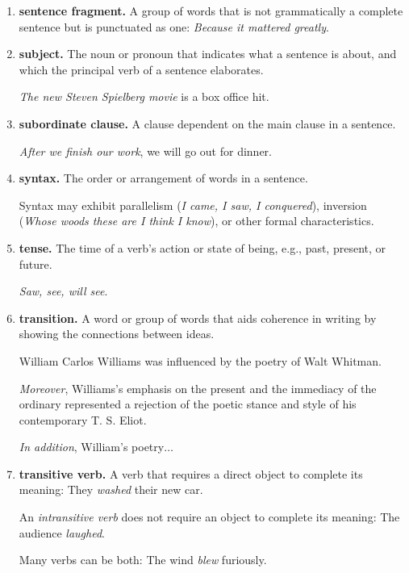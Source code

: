 \documentclass{book}
\numberwithin{equation}{section}
\begin{document}
\begin{enumerate}
    If commas were added before \textit{who} and after \textit{exceptionally}, the clause would be nonrestrictive and would suggest that \textit{all} professional athletes should receive stratospheric salaries.
    \item \textbf{sentence fragment.} A group of words that is not grammatically a complete sentence but is punctuated as one: \textit{Because it mattered greatly}.
    \item \textbf{subject.} The noun or pronoun that indicates what a sentence is about, and which the principal verb of a sentence elaborates.
    
    \textit{The new Steven Spielberg movie} is a box office hit.
    \item \textbf{subordinate clause.} A clause dependent on the main clause in a sentence.
    
    \textit{After we finish our work}, we will go out for dinner.
    \item \textbf{syntax.} The order or arrangement of words in a sentence.
    
    Syntax may exhibit parallelism (\textit{I came, I saw, I conquered}), inversion (\textit{Whose woods these are I think I know}), or other formal characteristics.
    \item \textbf{tense.} The time of a verb's action or state of being, e.g., past, present, or future.
    
    \textit{Saw, see, will see}.
    \item \textbf{transition.} A word or group of words that aids coherence in writing by showing the connections between ideas.
    
    William Carlos Williams was influenced by the poetry of Walt Whitman.
    
    \textit{Moreover}, Williams's emphasis on the present and the immediacy of the ordinary represented a rejection of the poetic stance and style of his contemporary T. S. Eliot.
    
    \textit{In addition}, William's poetry$\ldots$
    \item \textbf{transitive verb.} A verb that requires a direct object to complete its meaning: They \textit{washed} their new car.
    
    An \textit{intransitive verb} does not require an object to complete its meaning: The audience \textit{laughed}.
    
    Many verbs can be both: The wind \textit{blew} furiously.
    

\end{enumerate}
\end{document}
